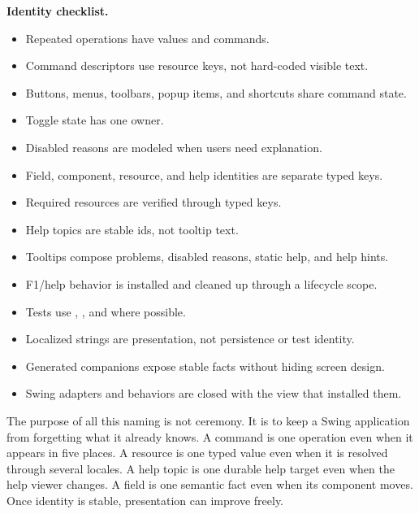 \begin{center}
\textbf{Identity checklist.}
\end{center}

\begin{itemize}
\item Repeated operations have  values and commands.
\item Command descriptors use resource keys, not hard-coded visible text.
\item Buttons, menus, toolbars, popup items, and shortcuts share command state.
\item Toggle state has one owner.
\item Disabled reasons are modeled when users need explanation.
\item Field, component, resource, and help identities are separate typed keys.
\item Required resources are verified through typed keys.
\item Help topics are stable ids, not tooltip text.
\item Tooltips compose problems, disabled reasons, static help, and help hints.
\item F1/help behavior is installed and cleaned up through a lifecycle scope.
\item Tests use , , and  where possible.
\item Localized strings are presentation, not persistence or test identity.
\item Generated companions expose stable facts without hiding screen design.
\item Swing adapters and behaviors are closed with the view that installed them.
\end{itemize}

The purpose of all this naming is not ceremony. It is to keep a Swing
application from forgetting what it already knows. A command is one operation
even when it appears in five places. A resource is one typed value even when it
is resolved through several locales. A help topic is one durable help target
even when the help viewer changes. A field is one semantic fact even when its
component moves. Once identity is stable, presentation can improve freely.
